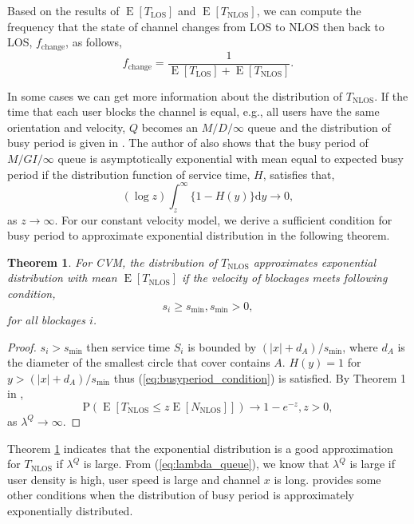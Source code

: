 \documentclass[10pt, conference, letterpaper]{IEEEtran}
\newtheorem{theorem}{Theorem}
\DeclareMathOperator*{\E}{\mathrm{E}}
\DeclareMathOperator*{\LOS}{\mathrm{LOS}}
\DeclareMathOperator*{\NLOS}{\mathrm{NLOS}}
\begin{document}
Based on the results of $\E[T_{\LOS}]$ and $\E[T_{\NLOS}]$, we can compute the frequency that the state of channel changes from LOS to NLOS then back to LOS, $f_{\mathrm{change}}$, as follows,
\begin{equation*}\label{eq:frequency}
f_{\mathrm{change}} = \frac{1}{\E[T_{\LOS}] + \E[T_{\NLOS}]}.
\end{equation*}  

In some cases we can get more information about the distribution of $T_{\NLOS}$. If the time that each user blocks the channel is equal, e.g., all users have the same orientation and velocity, $Q$ becomes an $M/D/\infty$ queue and the distribution of busy period is given in \cite{busyperiod_heavytraffic}. The author of \cite{busyperiod_heavytraffic} also shows that the busy period of $M/GI/\infty$ queue is asymptotically exponential with mean equal to expected busy period if the distribution function of service time, $H$, satisfies that,  
\begin{equation}\label{eq:busyperiod_condition}
(\log z) \int_{z}^{\infty}\{1-H(y)\}\mathrm{d}y\rightarrow 0,
\end{equation}
as $z\rightarrow \infty$. 
For our constant velocity model, we derive a sufficient condition for busy period to approximate exponential distribution in the following theorem.

\begin{theorem}\label{theorem:T_NLOS_exp}
For CVM, the distribution of $T_{\NLOS}$ approximates exponential distribution with mean $\E[T_{\NLOS}]$ if the velocity of blockages meets following condition,
\begin{equation}\label{condition:T_NLOS_exp}
s_i\geq s_{\min}, s_{\min}>0,
\end{equation} 
for all blockages $i$.
\end{theorem}

\begin{proof}
$s_i>s_{\min}$ then service time $S_i$ is bounded by $(|x|+d_A)/s_{\min}$, where $d_A$ is the diameter of the smallest circle that cover contains $A$. $H(y) = 1$ for $y>(|x|+d_A)/s_{\min}$ thus (\ref{eq:busyperiod_condition}) is satisfied. By Theorem 1 in \cite{busyperiod_heavytraffic}, 
\begin{equation*}
\mathrm{P}(\E[T_{\NLOS} \leq z\E[N_{\NLOS}]]) \rightarrow 1-e^{-z}, z>0,
\end{equation*} 
as $\lambda^Q\rightarrow \infty$.
\end{proof}

Theorem \ref{theorem:T_NLOS_exp} indicates that the exponential distribution is a good approximation for $T_{\NLOS}$ if $\lambda^Q$ is large. From (\ref{eq:lambda_queue}), we know that $\lambda^Q$ is large if user density is high, user speed is large and channel $x$ is long. \cite{busyperiod_exponential} provides some other conditions when the distribution of busy period is approximately exponentially distributed.
 
\end{document}

